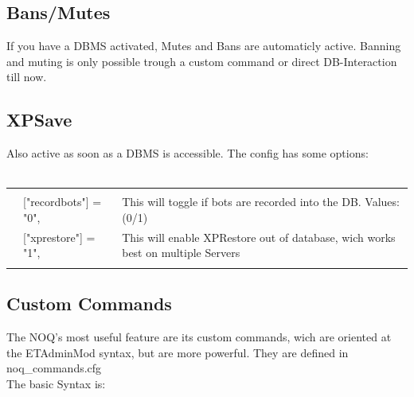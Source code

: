 \documentclass[12pt,a4paper]{article}
\numberwithin{footnote}{page} %
\begin{document}
\subsection{Bans/Mutes}
If you have a DBMS activated, Mutes and Bans are automaticly active.
Banning and muting is only possible trough a custom command or direct DB-Interaction till now.

\subsection{XPSave}
Also active as soon as a DBMS is accessible.
The config has some options:
\\
\\
\begin{tabular}{l l|l}
\hline & & \\
& 	["recordbots"] = "0", 	& This will toggle if bots are recorded into the DB. Values:(0/1)\\
& 	["xprestore"] = "1",	& This will enable XPRestore out of database, wich works best on multiple Servers\\
 & &  \\
 \hline
\end{tabular}

\newpage

\subsection{Custom Commands}

The NOQ's most useful feature are its custom commands, wich are oriented at the ETAdminMod syntax, but are more powerful. They are defined in noq\_commands.cfg
\\
The basic Syntax is:
\end{document}
